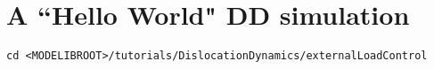 \section{A ``Hello World" DD simulation}


\begin{verbatim}
cd <MODELIBROOT>/tutorials/DislocationDynamics/externalLoadControl
\end{verbatim}










